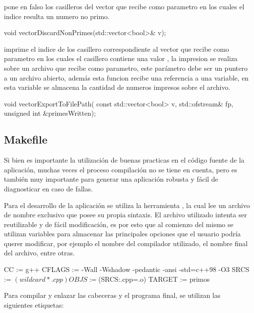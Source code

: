 \documentclass[12pt]{article}
\newenvironment{fullgrayverb}
{\verbbox}
{\endverbbox\par\colorbox{gray!25}{\parbox{\textwidth}{\theverbbox}}\par}
\begin{document}
 pone en falso los casilleros del vector que recibe
como parametro en los cuales el indice resulta un numero no primo.

\begin{fullgrayverb}[\mbox{}]
void vectorDiscardNonPrimes(std::vector<bool>& v);
\end{fullgrayverb}

 imprime el indice de los casillero correspondiente
al vector que recibe como parametro en los cuales el casillero contiene una
valor , la impresion se realiza sobre un archivo que recibe como
parametro, este parámetro debe ser un puntero a un archivo abierto, además esta
funcion recibe una referencia a una variable, en esta variable se almacena la
cantidad de numeros impresos sobre el archivo.

\begin{fullgrayverb}[\mbox{}]
void vectorExportToFilePath(
         const std::vector<bool> v,
         std::ofstream& fp,
         unsigned int &primesWritten);
\end{fullgrayverb}

\subsection{Makefile}

Si bien es importante la utilización de buenas practicas en el código fuente de
la aplicación, muchas veces el proceso compilación no se tiene en cuenta,
pero es también muy importante para generar una aplicación robusta y fácil de
diagnosticar en caso de fallas.

Para el desarrollo de la aplicación se utiliza la herramienta ,
la cual lee un archivo de nombre exclusivo  que posee su propia
sintaxis. El archivo  utilizado intenta ser reutilizable y de
fácil modificación, es por esto que al comienzo del mismo se utilizan variables
para almacenar las principales opciones que el usuario podría querer modificar,
por ejemplo el nombre del compilador utilizado, el nombre final del archivo,
entre otras.

\begin{fullgrayverb}[\mbox{}]
CC := g++
CFLAGS := -Wall -Wshadow -pedantic -ansi -std=c++98 -O3
SRCS := $(wildcard *.cpp)
OBJS := $(SRCS:.cpp=.o)
TARGET := primos
\end{fullgrayverb}

Para compilar y enlazar las cabeceras y el programa final, se utilizan las
siguientes etiquetas:
\end{document}
